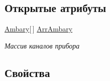 \subsection*{Открытые атрибуты}
\begin{DoxyCompactItemize}
\item 
\hyperlink{struct_s_m_p_l_sharp_1_1_objects_1_1_smpl_multi_device_1_1_ambary}{Ambary}\mbox{[}$\,$\mbox{]} \hyperlink{class_s_m_p_l_sharp_1_1_objects_1_1_smpl_multi_device_a79eb6ab1f7b988772404220d27fa78b0}{Arr\-Ambary}
\begin{DoxyCompactList}\small\item\em Массив каналов прибора \end{DoxyCompactList}\end{DoxyCompactItemize}
\subsection*{Свойства}

